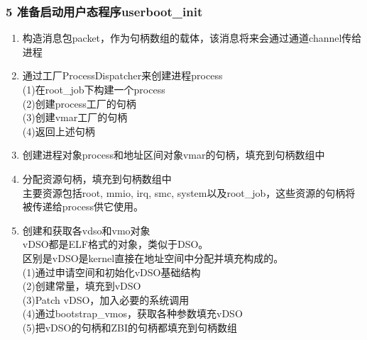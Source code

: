 \documentclass[
8pt, %
]{beamer}
\begin{document}
	\begin{frame}
		\frametitle{5 准备启动用户态程序userboot\_init}
		\begin{enumerate}
			\item 构造消息包packet，作为句柄数组的载体，该消息将来会通过通道channel传给进程
			\item 通过工厂ProcessDispatcher来创建进程process\\
			(1)在root\_job下构建一个process\\
			(2)创建process工厂的句柄\\
			(3)创建vmar工厂的句柄\\
			(4)返回上述句柄
			\item 创建进程对象process和地址区间对象vmar的句柄，填充到句柄数组中
			\item 分配资源句柄，填充到句柄数组中\\
			主要资源包括root, mmio, irq, smc, system以及root\_job，这些资源的句柄将被传递给process供它使用。
			\item 创建和获取各vdso和vmo对象\\
			vDSO都是ELF格式的对象，类似于DSO。\\
			区别是vDSO是kernel直接在地址空间中分配并填充构成的。\\
			(1)通过申请空间和初始化vDSO基础结构\\
			(2)创建常量，填充到vDSO\\
			(3)Patch vDSO，加入必要的系统调用\\
			(4)通过bootstrap\_vmos，获取各种参数填充vDSO\\
			(5)把vDSO的句柄和ZBI的句柄都填充到句柄数组
		\end{enumerate}
	\end{frame}
\end{document}
